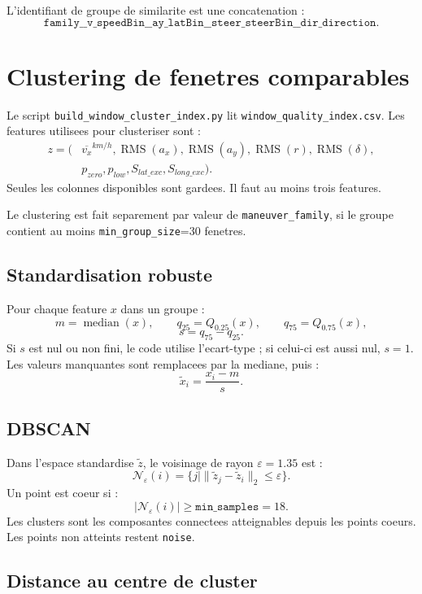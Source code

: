 \documentclass[11pt,a4paper]{article}
\newcommand{\RMS}{\operatorname{RMS}}
\newcommand{\median}{\operatorname{median}}
\begin{document}
L'identifiant de groupe de similarite est une concatenation :
\[
\texttt{family\_\_v\_speedBin\_\_ay\_latBin\_\_steer\_steerBin\_\_dir\_direction}.
\]

\section{Clustering de fenetres comparables}

Le script \texttt{build\_window\_cluster\_index.py} lit \texttt{window\_quality\_index.csv}.
Les features utilisees pour clusteriser sont :
\[
\begin{aligned}
  z = (&\overline{v_x}^{km/h},\RMS(a_x),\RMS(a_y),\RMS(r),\RMS(\delta),\\
       &p_{zero},p_{low},S_{lat\_exc},S_{long\_exc}).
\end{aligned}
\]
Seules les colonnes disponibles sont gardees. Il faut au moins trois features.

Le clustering est fait separement par valeur de \texttt{maneuver\_family}, si le groupe contient au moins \texttt{min\_group\_size}=30 fenetres.

\subsection{Standardisation robuste}

Pour chaque feature $x$ dans un groupe :
\[
  m=\median(x),\qquad
  q_{25}=Q_{0.25}(x),\qquad
  q_{75}=Q_{0.75}(x),
\]
\[
  s=q_{75}-q_{25}.
\]
Si $s$ est nul ou non fini, le code utilise l'ecart-type ; si celui-ci est aussi nul, $s=1$.
Les valeurs manquantes sont remplacees par la mediane, puis :
\[
  \tilde{x}_i=\frac{x_i-m}{s}.
\]

\subsection{DBSCAN}

Dans l'espace standardise $\tilde{z}$, le voisinage de rayon $\varepsilon=1.35$ est :
\[
  \mathcal{N}_{\varepsilon}(i)=\{j\mid \|\tilde{z}_j-\tilde{z}_i\|_2\le \varepsilon\}.
\]
Un point est coeur si :
\[
  |\mathcal{N}_{\varepsilon}(i)|\ge \texttt{min\_samples}=18.
\]
Les clusters sont les composantes connectees atteignables depuis les points coeurs. Les points non atteints restent \texttt{noise}.

\subsection{Distance au centre de cluster}
\end{document}
